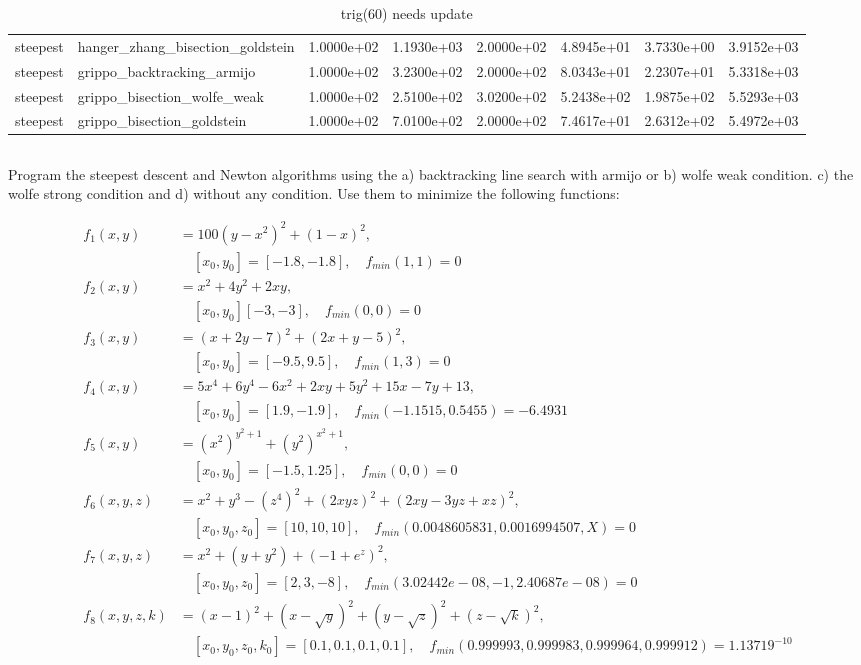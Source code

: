 \documentclass[a4paper,11pt]{article}
\numberwithin{equation}{section} %
\begin{document}
\begin{table}[h!]
{\begin{tabular}{|l|l|l|l|l|l|l|l|}
        steepest & hanger\_zhang\_bisection\_goldstein & 1.0000e+02 & 1.1930e+03 & 2.0000e+02 & 4.8945e+01 & 3.7330e+00 & 3.9152e+03 \\
        steepest & grippo\_backtracking\_armijo & 1.0000e+02 & 3.2300e+02 & 2.0000e+02 & 8.0343e+01 & 2.2307e+01 & 5.3318e+03 \\
        steepest & grippo\_bisection\_wolfe\_weak & 1.0000e+02 & 2.5100e+02 & 3.0200e+02 & 5.2438e+02 & 1.9875e+02 & 5.5293e+03 \\
        steepest & grippo\_bisection\_goldstein & 1.0000e+02 & 7.0100e+02 & 2.0000e+02 & 7.4617e+01 & 2.6312e+02 & 5.4972e+03 \\
\end{tabular}}
\caption{trig(60) needs update}
\label{table:trig(60)}
\end{table}

\clearpage

\subsection{}

Program the steepest descent and Newton algorithms using the a) backtracking line search with armijo or b) wolfe weak condition. c) the wolfe strong condition and d) without any condition. Use them to minimize the following functions:

\begin{align*}
    f_1(x,y) &= 100 (y-x^2)^2 + (1-x)^2, \\ &\quad [x_0,y_0] = [-1.8,-1.8], \quad f_{min}(1,1)=0  \\
    f_2(x,y) &= x^2 + 4y^2 + 2xy, \\ & \quad [x_0,y_0] [-3,-3], \quad f_{min}(0,0) = 0 \\
    f_3(x,y) &= (x+2y-7)^2 + (2x+y-5)^2, \\ & \quad [x_0,y_0] = [-9.5,9.5], \quad f_{min}(1,3) = 0 \\
    f_4(x,y) &= 5x^4 + 6y^4 - 6x^2 + 2xy + 5y^2 + 15x -7y + 13, \\ & \quad [x_0,y_0] = [1.9,-1.9], \quad f_{min}(-1.1515,0.5455) = -6.4931 \\ 
    f_5(x,y) &= (x^2)^{y^2+1} + (y^2)^{x^2+1},\\ & \quad [x_0,y_0] = [-1.5,1.25], \quad f_{min}(0,0) = 0 \\
    f_6(x,y,z) &= x^2 + y^3 - (z^4)^2 + (2xyz)^2 + (2xy-3yz+xz)^2, \\ & \quad [x_0,y_0,z_0] = [10,10,10], \quad f_{min}(0.0048605831,0.0016994507,X) = 0 \\
    f_7(x,y,z) &= x^2 + (y + y^2) + (-1 + e^z)^2, \\ & \quad [x_0,y_0,z_0] = [2,3,-8], \quad f_{min}(3.02442e-08,-1,2.40687e-08) = 0 \\
    f_8(x,y,z,k) &= (x-1)^2 + (x-\sqrt{y})^2 + (y-\sqrt{z})^2 + (z-\sqrt{k})^2, \\ & \quad [x_0,y_0,z_0,k_0] = [0.1,0.1,0.1,0.1], \quad f_{min}(0.999993,0.999983,0.999964,0.999912) = 1.13719^{-10} \\
\end{align*}
\end{document}
